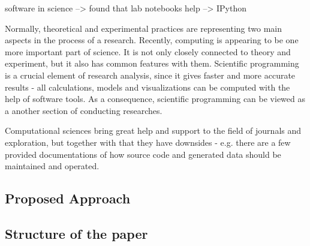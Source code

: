 software in science --> found that lab notebooks help --> IPython

Normally, theoretical and experimental practices are representing two main aspects in the process of a research. Recently, computing is appearing to be one more important part of science. It is not only closely connected to theory and experiment, but it also has common features with them. Scientific programming is a crucial element of research analysis, since it gives faster and more accurate results - all calculations, models and visualizations can be computed with the help of software tools. As a consequence, scientific programming can be viewed as a another section of conducting researches.\cite{johansson2014introduction}

Computational sciences bring great help and support to the field of journals and exploration, but together with that they have downsides - e.g. there are a few provided documentations of how source code and generated data should be maintained and operated.\cite{johansson2014introduction} 


\subsection{Proposed Approach}

\subsection{Structure of the paper}